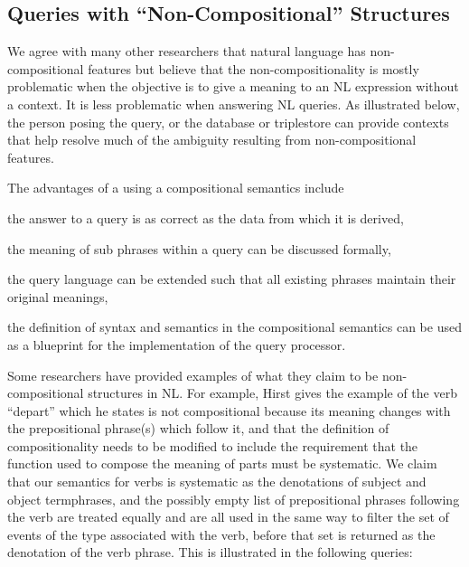 \documentclass[../main.tex]{subfiles}
\begin{document}
\begin{refsection}



\subsection{Queries with ``Non-Compositional'' Structures}
\label{webist2019conf:noncompositional}

We agree with many other researchers that natural language has non-compositional features but believe that the non-compositionality is mostly problematic when the objective is to give a meaning to an NL expression without a context. It is less problematic when answering NL queries. As illustrated below, the person posing the query, or the database or triplestore can provide contexts that help resolve much of the ambiguity resulting from non-compositional features.

The advantages of a using a compositional semantics include
\begin{inparaenum}[1)]
	\item the answer to a query is as correct as the data from which it is derived,
	\item  the meaning of sub phrases within a query can be discussed formally,
	\item the query language can be extended such that all existing phrases maintain their original meanings,
	\item the definition of syntax and semantics in the compositional semantics can be used as a blueprint for the implementation of the query processor.
\end{inparaenum}

Some researchers have provided examples of what they claim to be non-compositional structures in NL. For example, Hirst \cite{hirst1992semantic} gives the example of the verb ``depart'' which he states is not compositional because its meaning changes with the prepositional phrase(s) which follow it, and that the definition of compositionality needs to be modified to include the requirement that the function used to compose the meaning of parts must be systematic. We claim that our semantics for verbs is systematic as the denotations of subject and object termphrases, and the possibly empty list of prepositional phrases following the verb are treated equally and are all used in the same way to filter the set of events of the type associated with the verb, before that set is returned as the denotation of the verb phrase. This is illustrated in the following queries:


\end{refsection}
\end{document}
